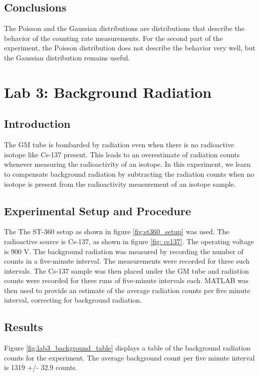 \documentclass[reprint,amsmath,amssymb,aps,prl]{revtex4-2}
\begin{document}
\subsection{Conclusions}
The Poisson and the Gaussian distributions are distributions that describe the behavior of the counting rate measurements. For the second part of the experiment, the Poisson distribution does not describe the behavior very well, but the Gaussian distribution remains useful. 

\section{Lab 3: Background Radiation }

\subsection{Introduction}
The GM tube is bombarded by radiation even when there is no radioactive isotope like Cs-137 present. This leads to an overestimate of radiation counts whenever measuring the radioactivity of an isotope. In this experiment, we learn to compensate background radiation by subtracting the radiation counts when no isotope is present from the radioactivity measurement of an isotope sample. 

\subsection{Experimental Setup and Procedure}
The The ST-360 setup as shown in figure \ref{fig:st360_setup} was used. The
radioactive source is Cs-137, as shown in figure \ref{fig: cs137}. The operating voltage is 900 V. The background radiation was measured by recording the number of counts in a five-minute interval. The measurements were recorded for three such intervals. The Cs-137 sample was then placed under the GM tube and radiation counts were recorded for three runs of five-minute intervals each. MATLAB was then used to provide an estimate of the average radiation counts per five minute interval, correcting for background radiation. 

\subsection{Results}
Figure \ref{fig:lab3_background_table} displays a table of the background radiation counts for the experiment. The average background count per five minute interval is 1319  +/- 32.9 counts. 
\end{document}
